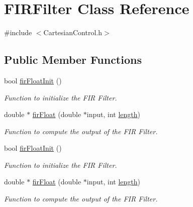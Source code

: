 \hypertarget{classFIRFilter}{}\section{F\+I\+R\+Filter Class Reference}
\label{classFIRFilter}


{\ttfamily \#include $<$Cartesian\+Control.\+h$>$}

\subsection*{Public Member Functions}
\begin{DoxyCompactItemize}
\item 
bool \hyperlink{classFIRFilter_a03b7ef73545b59416afe789235b4404a}{fir\+Float\+Init} ()
\begin{DoxyCompactList}\small\item\em Function to initialize the F\+IR Filter. \end{DoxyCompactList}\item 
double $\ast$ \hyperlink{classFIRFilter_aca52df7e1d89d1c324489daaff6fa526}{fir\+Float} (double $\ast$input, int \hyperlink{classFIRFilter_a4e697a78993656c942005939a3439b3f}{length})
\begin{DoxyCompactList}\small\item\em Function to compute the output of the F\+IR Filter. \end{DoxyCompactList}\item 
bool \hyperlink{classFIRFilter_a03b7ef73545b59416afe789235b4404a}{fir\+Float\+Init} ()
\begin{DoxyCompactList}\small\item\em Function to initialize the F\+IR Filter. \end{DoxyCompactList}\item 
double $\ast$ \hyperlink{classFIRFilter_ac48c94066f3ecb79f80e7a20197416d7}{fir\+Float} (double $\ast$input, int \hyperlink{classFIRFilter_a4e697a78993656c942005939a3439b3f}{length})
\begin{DoxyCompactList}\small\item\em Function to compute the output of the F\+IR Filter. \end{DoxyCompactList}\end{DoxyCompactItemize}
